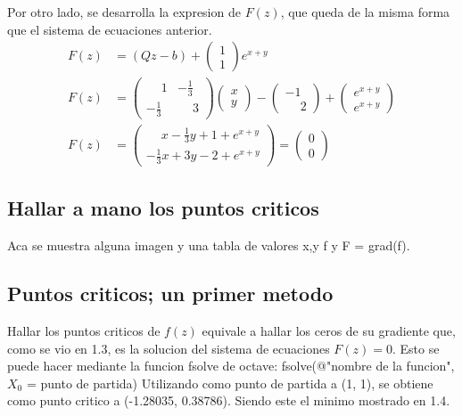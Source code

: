 \documentclass{article}
\begin{document}
    Por otro lado, se desarrolla la expresion de $F(z)$, que queda de la misma forma que el sistema de ecuaciones anterior.
    \begin{align}
        F(z) &= (Qz - b) + \left(\begin{matrix} 1\\1 \end{matrix}\right)e^{x+y}
        \\
        F(z) &= \begin{pmatrix} \phantom{-}1 & -\frac{1}{3} \\ -\frac{1}{3} & \phantom{-}3\end{pmatrix} \begin{pmatrix} x\\y \end{pmatrix}
                -\begin{pmatrix} -1\\\phantom{-}2 \end{pmatrix} + \begin{pmatrix} e^{x+y}\\e^{x+y} \end{pmatrix}
        \\
        F(z) &= \begin{pmatrix} \phantom{-}x -\frac{1}{3}y + 1 +e^{x+y} \\ -\frac{1}{3}x + 3y - 2 +e^{x+y} \end{pmatrix} = \begin{pmatrix} 0\\0 \end{pmatrix}
    \end{align}

    \subsection{Hallar a mano los puntos criticos}
    Aca se muestra alguna imagen y una tabla de valores x,y f y F = grad(f).

    \subsection{Puntos criticos; un primer metodo}
    Hallar los puntos criticos de $f(z)$ equivale a hallar los ceros de su gradiente que, como se vio en 1.3, es la
    solucion del sistema de ecuaciones $F(z) = 0$.
    Esto se puede hacer mediante la funcion fsolve de octave:
        fsolve(@"nombre de la funcion",$X_0$ = punto de partida)
    Utilizando como punto de partida a (1, 1), se obtiene como punto critico a (-1.28035, 0.38786).
    Siendo este el minimo mostrado en 1.4.
\end{document}
